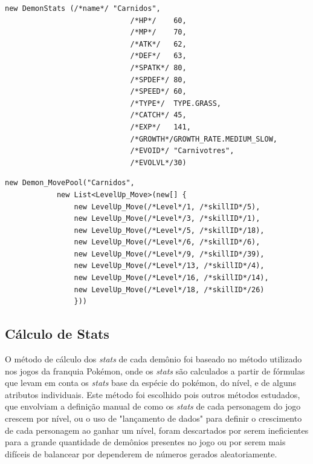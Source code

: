 \documentclass[
	12pt,				%
	openright,			%
	twoside,			%
	a4paper,			%
	english,			%
	french,				%
	spanish,			%
	brazil				%
	]{abntex2}
\begin{document}
	
\begin{lstlisting}
new DemonStats (/*name*/ "Carnidos",
                             /*HP*/    60,
                             /*MP*/    70, 
                             /*ATK*/   62, 
                             /*DEF*/   63, 
                             /*SPATK*/ 80, 
                             /*SPDEF*/ 80, 
                             /*SPEED*/ 60,
                             /*TYPE*/  TYPE.GRASS,
                             /*CATCH*/ 45,
                             /*EXP*/   141,
                             /*GROWTH*/GROWTH_RATE.MEDIUM_SLOW,
                             /*EVOID*/ "Carnivotres",
                             /*EVOLVL*/30)
\end{lstlisting}

\begin{lstlisting}
new Demon_MovePool("Carnidos", 
            new List<LevelUp_Move>(new[] {
                new LevelUp_Move(/*Level*/1, /*skillID*/5),
                new LevelUp_Move(/*Level*/3, /*skillID*/1),
                new LevelUp_Move(/*Level*/5, /*skillID*/18),
                new LevelUp_Move(/*Level*/6, /*skillID*/6),
                new LevelUp_Move(/*Level*/9, /*skillID*/39),
                new LevelUp_Move(/*Level*/13, /*skillID*/4),
                new LevelUp_Move(/*Level*/16, /*skillID*/14),
                new LevelUp_Move(/*Level*/18, /*skillID*/26)
                }))
\end{lstlisting}

\subsection{Cálculo de Stats}\label{chap:Stats}

	O método de cálculo dos \emph{stats} de cada demônio foi baseado no método utilizado nos jogos da franquia Pokémon, onde os \emph{stats} são calculados a partir de fórmulas que levam em conta os \emph{stats} base da espécie do pokémon, do nível, e de alguns atributos individuais. Este método foi escolhido pois outros métodos estudados, que envolviam a definição manual de como os \emph{stats} de cada personagem do jogo crescem por nível, ou o uso de "lançamento de dados" para definir o crescimento de cada personagem ao ganhar um nível, foram descartados por serem ineficientes para a grande quantidade de demônios presentes no jogo ou por serem mais difíceis de balancear por dependerem de números gerados aleatoriamente.
	
\end{document}
